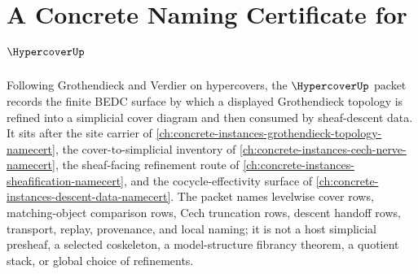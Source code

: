 \chapter{A Concrete Naming Certificate for $\HypercoverUp$}
\label{ch:concrete-instances-hypercover-namecert}

Following Grothendieck and Verdier on hypercovers, the $\HypercoverUp$ packet records the finite BEDC surface by which a displayed Grothendieck topology is refined into a simplicial cover diagram and then consumed by sheaf-descent data. It sits after the site carrier of \autoref{ch:concrete-instances-grothendieck-topology-namecert}, the cover-to-simplicial inventory of \autoref{ch:concrete-instances-cech-nerve-namecert}, the sheaf-facing refinement route of \autoref{ch:concrete-instances-sheafification-namecert}, and the cocycle-effectivity surface of \autoref{ch:concrete-instances-descent-data-namecert}. The packet names levelwise cover rows, matching-object comparison rows, Cech truncation rows, descent handoff rows, transport, replay, provenance, and local naming; it is not a host simplicial presheaf, a selected coskeleton, a model-structure fibrancy theorem, a quotient stack, or global choice of refinements.

